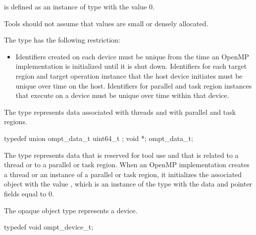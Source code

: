  is defined as an instance of type  
with the value 0.

Tools should not assume that  values are small or densely allocated.

\restrictions
The  type has the following restriction:

\begin{itemize}
\item Identifiers created on each device must be unique from the time an OpenMP 
      implementation is initialized until it is shut down. Identifiers for each 
      target region and target operation instance that the host device initiates
      must be unique over time on the host. Identifiers for parallel and task 
      region instances that execute on a device must be unique over time within 
      that device.
\end{itemize}



\label{sec:ompt_data_t}

\summary
The  type represents data associated with threads and 
with parallel and task regions.

\format
\begin{ccppspecific}
\begin{omptOther}
typedef union ompt_data_t {
  uint64_t ;
  void *;
} ompt_data_t;
\end{omptOther}
\end{ccppspecific}

\descr
The  type represents data that is reserved for tool use and
that is related to a thread or to a parallel or task region. When an OpenMP 
implementation creates a thread or an instance of a parallel or task region, 
it initializes the associated  object with the value 
, which is an instance of the type with the data and 
pointer fields equal to 0.



\label{sec:ompt_device_t}

\summary
The  opaque object type represents a device.

\format
\begin{ccppspecific}
\begin{omptOther}
typedef void ompt_device_t;
\end{omptOther}
\end{ccppspecific}



